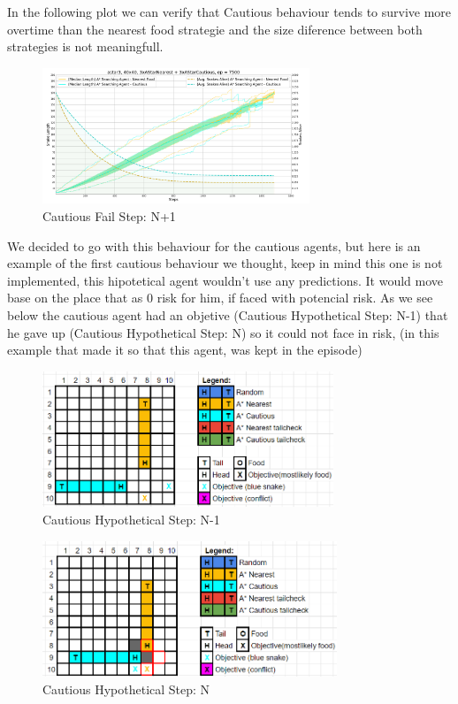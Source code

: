 In the following plot we can verify that Cautious behaviour tends to survive more overtime than the nearest food strategie and the size diference between both strategies is not meaningfull.

\begin{figure}
  \includegraphics[height=1.6in]{plot_astar3}
\caption{Cautious Fail Step: N+1}
\end{figure}




We decided to go with this behaviour for the cautious agents, but here is an example of the first cautious behaviour we thought, keep in mind this one is not implemented, this hipotetical agent wouldn't use any predictions. It would move base on the place that as 0 risk for him, if faced with potencial risk.
As we see below the cautious agent had an objetive (Cautious Hypothetical Step: N-1) that he gave up (Cautious Hypothetical Step: N) so it could not face in risk, (in this example that made it so that this agent, was kept in the episode)

\begin{figure}
\includegraphics[height=1.6in]{C1}
\caption{Cautious Hypothetical Step: N-1}
\end{figure}
  
\begin{figure}
\includegraphics[height=1.6in]{C2}
\caption{Cautious Hypothetical Step: N}
\end{figure}

